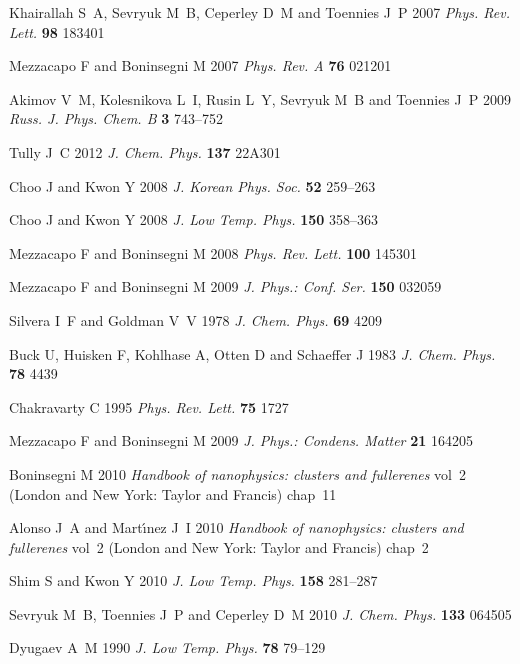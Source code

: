 \documentclass[12pt]{iopart}
\begin{document}
\begin{thebibliography}{100}
Khairallah S~A, Sevryuk M~B, Ceperley D~M and Toennies J~P 2007 {\em Phys. Rev.
  Lett.\/} {\bf 98} 183401

Mezzacapo F and Boninsegni M 2007 {\em Phys. Rev. A\/} {\bf 76} 021201

Akimov V~M, Kolesnikova L~I, Rusin L~Y, Sevryuk M~B and Toennies J~P 2009 {\em
  Russ. J. Phys. Chem. B\/} {\bf 3} 743--752

Tully J~C 2012 {\em J. Chem. Phys.\/} {\bf 137} 22A301

Choo J and Kwon Y 2008 {\em J. Korean Phys. Soc.\/} {\bf 52} 259--263

Choo J and Kwon Y 2008 {\em J. Low Temp. Phys.\/} {\bf 150} 358--363

Mezzacapo F and Boninsegni M 2008 {\em Phys. Rev. Lett.\/} {\bf 100} 145301

Mezzacapo F and Boninsegni M 2009 {\em J. Phys.: Conf. Ser.\/} {\bf 150} 032059

Silvera I~F and Goldman V~V 1978 {\em J. Chem. Phys.\/} {\bf 69} 4209

Buck U, Huisken F, Kohlhase A, Otten D and Schaeffer J 1983 {\em J. Chem.
  Phys.\/} {\bf 78} 4439

Chakravarty C 1995 {\em Phys. Rev. Lett.\/} {\bf 75} 1727

Mezzacapo F and Boninsegni M 2009 {\em J. Phys.: Condens. Matter\/} {\bf 21}
  164205

Boninsegni M 2010 {\em Handbook of nanophysics: clusters and fullerenes\/}
  vol~2 (London and New York: Taylor and Francis) chap~11

Alonso J~A and Mart{\'\i}nez J~I 2010 {\em Handbook of nanophysics: clusters
  and fullerenes\/} vol~2 (London and New York: Taylor and Francis) chap~2

Shim S and Kwon Y 2010 {\em J. Low Temp. Phys.\/} {\bf 158} 281--287

Sevryuk M~B, Toennies J~P and Ceperley D~M 2010 {\em J. Chem. Phys.\/} {\bf
  133} 064505

Dyugaev A~M 1990 {\em J. Low Temp. Phys.\/} {\bf 78} 79--129


\end{thebibliography}
\end{document}
